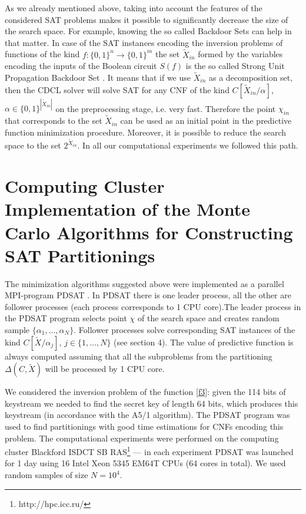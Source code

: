 \documentclass[runningheads,a4paper]{llncs}
\begin{document}
As we already mentioned above, taking into account the features of the considered SAT problems makes it possible to significantly decrease the size of the search space. For example, knowing the so called Backdoor Sets \cite{DBLP:conf/ijcai/WilliamsGS03} can help in that matter. In case of the SAT instances encoding the inversion problems of functions of the kind $f:\{0,1\}^n\rightarrow\{0,1\}^m$ the set $\tilde{X}_{in}$ formed by the variables encoding the inputs of the Boolean circuit $S(f)$ is the so called Strong Unit Propagation Backdoor Set \cite{DBLP:journals/constraints/JarvisaloJ09}. It means that if we use $\tilde{X}_{in}$ as a decomposition set, then the CDCL solver will solve SAT for any CNF of the kind $C\left[\tilde{X}_{in}/\alpha\right]$, $\alpha\in\{0,1\}^{|\tilde{X}_{in}|}$ on the preprocessing stage, i.e. very fast. Therefore the point $\chi_{in}$ that corresponds to the set $\tilde{X}_{in}$ can be used as an initial point in the predictive function minimization procedure. Moreover, it is possible to reduce the search space to the set $2^{\tilde{X}_{in}}$. In all our computational experiments we followed this path. 

\section{Computing Cluster Implementation of the Monte Carlo Algorithms for Constructing SAT Partitionings}

The minimization algorithms suggested above were implemented as a parallel MPI-program \textsc{\textsc{PDSAT}} \cite{DBLP:journals/corr/SemenovZ13}. In \textsc{\textsc{PDSAT}} there is one leader process, all the other are follower processes (each process corresponds to 1 CPU core).The leader process in the \textsc{PDSAT} program selects point $\chi$ of the search space and creates random sample $\{\alpha_1,\ldots,\alpha_N\}$. Follower processes solve corresponding SAT instances of the kind $C\left[\tilde{X}/\alpha_j\right]$, $j\in\{1,\ldots,N\}$ (see section 4). The value of predictive function is always computed assuming that all the subproblems from the partitioning $\Delta\left(C,\tilde{X}\right)$ will be processed by 1 CPU core. 

We considered the inversion problem of the function \eqref{f3}: given the 114 bits of keystream we needed to find the secret key of length 64 bits, which produces this keystream (in accordance with the A5/1 algorithm). The \textsc{\textsc{PDSAT}} program was used to find partitionings with good time estimations for CNFs encoding this problem. The computational experiments were performed on the computing cluster Blackford ISDCT SB RAS\footnote{http://hpc.icc.ru/} --– in each experiment \textsc{\textsc{PDSAT}} was launched for 1 day using 16 Intel Xeon 5345 EM64T CPUs (64 cores in total). We used random samples of size $N = 10^4$.
\end{document}
